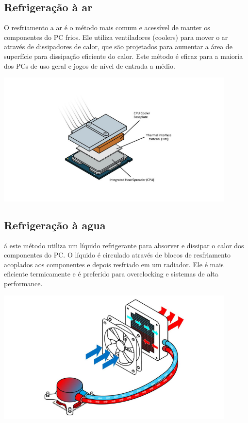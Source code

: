 \documentclass[12pt]{article}
\begin{document}
\subsection{Refrigeração à ar}
O resfriamento a ar é o método mais comum e acessível de manter os componentes do PC frios. Ele utiliza ventiladores (coolers) para mover o ar através de dissipadores de calor, que são projetados para aumentar a área de superfície para dissipação eficiente do calor. Este método é eficaz para a maioria dos PCs de uso geral e jogos de nível de entrada a médio.
\begin{adjustbox}{center,caption={Funcionamento básico de refrigeração a ar (Imagem: Intel/Divulgação)},nofloat=figure,vspace=\bigskipamount}
    \includegraphics[width=12cm]{fusca.png}
\end{adjustbox}
\subsection{Refrigeração à agua}
á este método utiliza um líquido refrigerante para absorver e dissipar o calor dos componentes do PC. O líquido é circulado através de blocos de resfriamento acoplados aos componentes e depois resfriado em um radiador. Ele é mais eficiente termicamente e é preferido para overclocking e sistemas de alta performance.
\begin{adjustbox}{center,caption={Exemplo de refrigeração liquida (Imagem: Intel/Divulgação)},nofloat=figure,vspace=\bigskipamount}
    \includegraphics[width=12cm]{ap.png}
\end{adjustbox}
\end{document}
